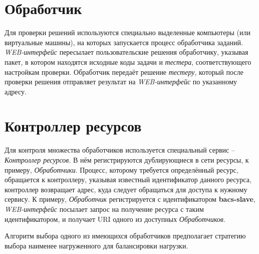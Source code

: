 \section{Обработчик}
Для проверки решений используются специально выделенные компьютеры (или виртуальные машины),
на которых запускается процесс обработчика заданий.
\textit{WEB-интерфейс} пересылает пользовательские решения обработчику, указывая пакет,
в котором находятся исходные коды задачи и \textit{тестера}, соответствующего
настройкам проверки. Обработчик передаёт решение \textit{тестеру}, который
после проверки решения отправляет результат на \textit{WEB-интерфейс} по указанному адресу.

\section{Контроллер ресурсов}
Для контроля множества обработчиков используется специальный сервис -- \textit{Контроллер ресурсов}.
В нём регистрируются дублирующиеся в сети ресурсы, к примеру, \textit{Обработчики}.
Процесс, которому требуется определённый ресурс, обращается к контроллеру,
указывая известный идентификатор данного ресурса,
контроллер возвращает адрес, куда следует обращаться для доступа к нужному сервису.
К примеру, \textit{Обработчик} регистрируется с идентификатором \textbf{bacs-slave},
\textit{WEB-интерфейс} посылает запрос на получение ресурса с таким идентификатором,
и получает URI одного из доступных \textit{Обработчиков}.

Алгоритм выбора одного из имеющихся обработчиков предполагает
стратегию выбора наименее нагруженного для балансировки нагрузки.
